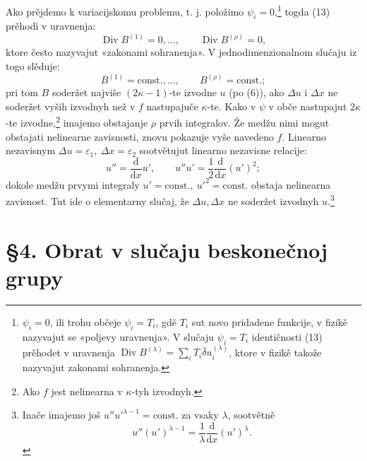 \documentclass[11pt]{article}
\providecommand{\eps}{\varepsilon}
\providecommand{\D}{\Delta}
\providecommand{\dd}{\mathrm d}
\DeclareMathOperator{\Div}{Div}
\providecommand{\bd}{\bar{\delta}}
\begin{document}
Ako prějdemo k variacijskomu problemu, t. j. položimo \(\psi_i=0\),\footnote{\(\psi_i=0\), ili trohu občeje \(\psi_i=T_i\), gdě \(T_i\) sut novo pridadene funkcije, v fizikě nazyvajut se «poljevy uravnenja». V slučaju \(\psi_i=T_i\) identičnosti (13) prěhodet v uravnenja \(\Div B^{(\lambda)}=\sum_i T_i\bd u_i^{(\lambda)}\), ktore v fizikě takože nazyvajut zakonami sohranenja.} togda (13) prěhodi v uravnenja:
\[
\Div B^{(1)}=0,\ldots,\qquad \Div B^{(\rho)}=0,
\]
ktore često nazyvajut «zakonami sohranenja». V jednodimenzionalnom slučaju iz togo slěduje:
\[
B^{(1)}=\mathrm{const.},\ldots,\qquad B^{(\rho)}=\mathrm{const.};
\]
pri tom \(B\) soderžet najviše \((2\kappa-1)\)-te izvodne \(u\) (po (6)), ako \(\D u\) i \(\D x\) ne soderžet vyših izvodnyh než v \(f\) nastupajuče \(\kappa\)-te. Kako v \(\psi\) v obče nastupajut \(2\kappa\)-te izvodne,\footnote{Ako \(f\) jest nelinearna v \(\kappa\)-tyh izvodnyh.} imajemo obstajanje \(\rho\) prvih integralov. Že medžu nimi mogut obstajati nelinearne zavisnosti, znovu pokazuje vyše navedeno \(f\). Linearno nezavisnym \(\D u=\eps_1,\ \D x=\eps_2\) sootvětujut linearno nezavisne relacije:
\[
u''=\frac{\dd}{\dd x}u',\qquad
u''u'=\frac12\frac{\dd}{\dd x}(u')^2;
\]
dokole medžu prvymi integraly \(u'=\mathrm{const.},\ u'^2=\mathrm{const.}\) obstaja nelinearna zavisnost. Tut ide o elementarny slučaj, že \(\D u,\D x\) ne soderžet izvodnyh \(u\).\footnote{Inače imajemo još \(u''u'^{\lambda-1}=\mathrm{const.}\) za vsaky \(\lambda\), sootvětně
\[
u''(u')^{\lambda-1}=\frac1\lambda\frac{\dd}{\dd x}(u')^\lambda.
\]}

\section*{\S{}4. Obrat v slučaju beskonečnoj grupy}
\end{document}
